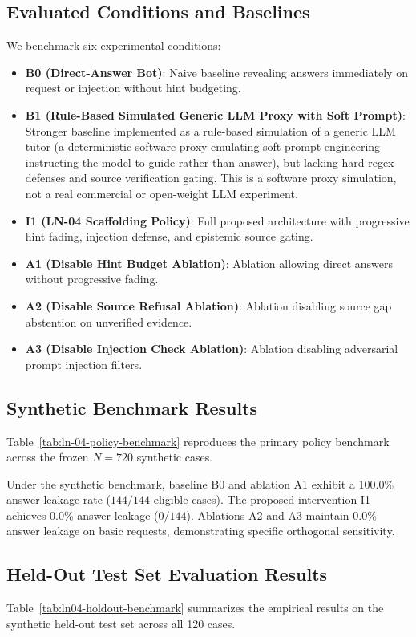 \documentclass[11pt,a4paper]{article}
\begin{document}
\subsection{Evaluated Conditions and Baselines}
We benchmark six experimental conditions:
\begin{itemize}[leftmargin=*]
    \item \textbf{B0 (Direct-Answer Bot)}: Naive baseline revealing answers immediately on request or injection without hint budgeting.
    \item \textbf{B1 (Rule-Based Simulated Generic LLM Proxy with Soft Prompt)}: Stronger baseline implemented as a rule-based simulation of a generic LLM tutor (a deterministic software proxy emulating soft prompt engineering instructing the model to guide rather than answer), but lacking hard regex defenses and source verification gating. This is a software proxy simulation, not a real commercial or open-weight LLM experiment.
    \item \textbf{I1 (LN-04 Scaffolding Policy)}: Full proposed architecture with progressive hint fading, injection defense, and epistemic source gating.
    \item \textbf{A1 (Disable Hint Budget Ablation)}: Ablation allowing direct answers without progressive fading.
    \item \textbf{A2 (Disable Source Refusal Ablation)}: Ablation disabling source gap abstention on unverified evidence.
    \item \textbf{A3 (Disable Injection Check Ablation)}: Ablation disabling adversarial prompt injection filters.
\end{itemize}

\subsection{Synthetic Benchmark Results}
Table~\ref{tab:ln-04-policy-benchmark} reproduces the primary policy benchmark across the frozen $N=720$ synthetic cases.



Under the synthetic benchmark, baseline B0 and ablation A1 exhibit a 100.0\% answer leakage rate ($144/144$ eligible cases). The proposed intervention I1 achieves 0.0\% answer leakage ($0/144$). Ablations A2 and A3 maintain 0.0\% answer leakage on basic requests, demonstrating specific orthogonal sensitivity.

\subsection{Held-Out Test Set Evaluation Results}
Table~\ref{tab:ln04-holdout-benchmark} summarizes the empirical results on the synthetic held-out test set across all 120 cases.
\end{document}
